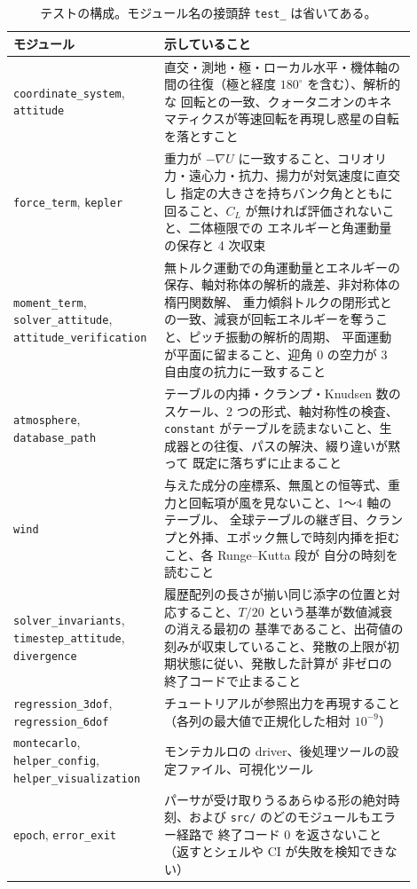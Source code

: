 \documentclass[11pt,a4paper,dvipdfmx]{jsarticle}
\begin{document}
\begin{table}[h]
\caption{テストの構成。モジュール名の接頭辞 \texttt{test\_} は省いてある。}
\label{test_modules}
\begin{center}
\small
\begin{tabular}{>{\raggedright\arraybackslash}p{0.30\linewidth}|>{\raggedright\arraybackslash}p{0.60\linewidth}}
\hline \hline
モジュール & 示していること \\
\hline
\texttt{coordinate\_system}, \texttt{attitude} &
直交・測地・極・ローカル水平・機体軸の間の往復（極と経度 $180^\circ$ を含む）、解析的な
回転との一致、クォータニオンのキネマティクスが等速回転を再現し惑星の自転を落とすこと \\
\texttt{force\_term}, \texttt{kepler} &
重力が $-\nabla U$ に一致すること、コリオリ力・遠心力・抗力、揚力が対気速度に直交し
指定の大きさを持ちバンク角とともに回ること、$C_L$ が無ければ評価されないこと、二体極限での
エネルギーと角運動量の保存と 4 次収束 \\
\texttt{moment\_term}, \texttt{solver\_attitude}, \texttt{attitude\_verification} &
無トルク運動での角運動量とエネルギーの保存、軸対称体の解析的歳差、非対称体の楕円関数解、
重力傾斜トルクの閉形式との一致、減衰が回転エネルギーを奪うこと、ピッチ振動の解析的周期、
平面運動が平面に留まること、迎角 0 の空力が 3 自由度の抗力に一致すること \\
\texttt{atmosphere}, \texttt{database\_path} &
テーブルの内挿・クランプ・Knudsen 数のスケール、2 つの形式、軸対称性の検査、
\texttt{constant} がテーブルを読まないこと、生成器との往復、パスの解決、綴り違いが黙って
既定に落ちずに止まること \\
\texttt{wind} &
与えた成分の座標系、無風との恒等式、重力と回転項が風を見ないこと、1〜4 軸のテーブル、
全球テーブルの継ぎ目、クランプと外挿、エポック無しで時刻内挿を拒むこと、各 Runge--Kutta 段が
自分の時刻を読むこと \\
\texttt{solver\_invariants}, \texttt{timestep\_attitude}, \texttt{divergence} &
履歴配列の長さが揃い同じ添字の位置と対応すること、$T/20$ という基準が数値減衰の消える最初の
基準であること、出荷値の刻みが収束していること、発散の上限が初期状態に従い、発散した計算が
非ゼロの終了コードで止まること \\
\texttt{regression\_3dof}, \texttt{regression\_6dof} &
チュートリアルが参照出力を再現すること（各列の最大値で正規化した相対 $10^{-9}$） \\
\texttt{montecarlo}, \texttt{helper\_config}, \texttt{helper\_visualization} &
モンテカルロの driver、後処理ツールの設定ファイル、可視化ツール \\
\texttt{epoch}, \texttt{error\_exit} &
パーサが受け取りうるあらゆる形の絶対時刻、および \texttt{src/} のどのモジュールもエラー経路で
終了コード 0 を返さないこと（返すとシェルや CI が失敗を検知できない） \\
\hline \hline
\end{tabular}
\end{center}
\end{table}
\end{document}
